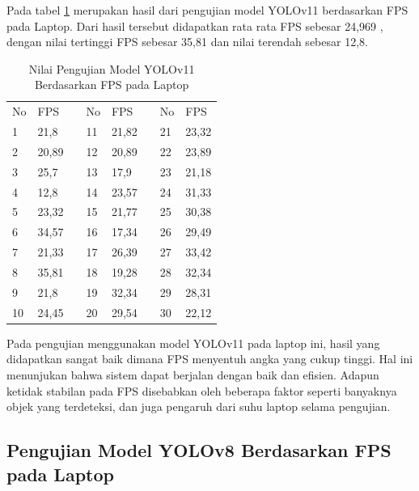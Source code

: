 Pada tabel \ref{tb:TabelYolov11Laptop} merupakan hasil dari pengujian model YOLOv11 berdasarkan FPS pada Laptop. Dari hasil tersebut didapatkan rata rata FPS sebesar 24,969 , dengan nilai tertinggi FPS sebesar 35,81 dan nilai terendah sebesar 12,8.

\begin{table}[H]
  \caption{Nilai Pengujian Model YOLOv11 Berdasarkan FPS pada Laptop} 
  \label{tb:TabelYolov11Laptop}
  \centering
  \begin{tabular}{|l|l|l|l|l|l|l|l|}
  \cline{1-2} \cline{4-5} \cline{7-8}
  No & FPS   &  & No & FPS   &  & No & FPS   \\ \cline{1-2} \cline{4-5} \cline{7-8} 
  1  & 21,8  &  & 11 & 21,82 &  & 21 & 23,32 \\ \cline{1-2} \cline{4-5} \cline{7-8} 
  2  & 20,89 &  & 12 & 20,89 &  & 22 & 23,89 \\ \cline{1-2} \cline{4-5} \cline{7-8} 
  3  & 25,7  &  & 13 & 17,9  &  & 23 & 21,18 \\ \cline{1-2} \cline{4-5} \cline{7-8} 
  4  & 12,8  &  & 14 & 23,57 &  & 24 & 31,33 \\ \cline{1-2} \cline{4-5} \cline{7-8} 
  5  & 23,32 &  & 15 & 21,77 &  & 25 & 30,38 \\ \cline{1-2} \cline{4-5} \cline{7-8} 
  6  & 34,57 &  & 16 & 17,34 &  & 26 & 29,49 \\ \cline{1-2} \cline{4-5} \cline{7-8} 
  7  & 21,33 &  & 17 & 26,39 &  & 27 & 33,42 \\ \cline{1-2} \cline{4-5} \cline{7-8} 
  8  & 35,81 &  & 18 & 19,28 &  & 28 & 32,34 \\ \cline{1-2} \cline{4-5} \cline{7-8} 
  9  & 21,8  &  & 19 & 32,34 &  & 29 & 28,31 \\ \cline{1-2} \cline{4-5} \cline{7-8} 
  10 & 24,45 &  & 20 & 29,54 &  & 30 & 22,12 \\ \cline{1-2} \cline{4-5} \cline{7-8} 
  \end{tabular}
  \end{table}

Pada pengujian menggunakan model YOLOv11 pada laptop ini, hasil yang didapatkan sangat baik dimana FPS menyentuh angka yang cukup tinggi. Hal ini menunjukan bahwa sistem dapat berjalan dengan baik dan efisien. Adapun ketidak stabilan pada FPS disebabkan oleh beberapa faktor seperti banyaknya objek yang terdeteksi, dan juga pengaruh dari suhu laptop selama pengujian. 

\subsection{Pengujian Model YOLOv8 Berdasarkan FPS pada Laptop}

